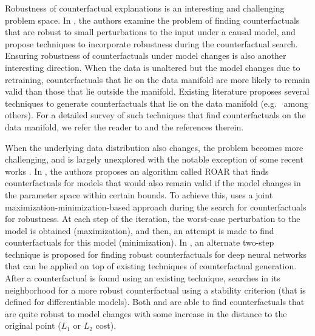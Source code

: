 \documentclass[sigconf]{acmart}
\newcommand{\sm}[1]{\textcolor{brown}{#1}}
\begin{document}
Robustness of counterfactual explanations is an interesting and challenging problem space. In \cite{dominguez2022adversarial}, the authors examine the problem of finding counterfactuals that are robust to small perturbations to the input under a causal model, and propose techniques to incorporate robustness during the counterfactual search. Ensuring robustness of counterfactuals under model changes is also another interesting direction. When the data is unaltered but the model changes due to retraining, counterfactuals that lie on the data manifold are more likely to remain valid than those that lie outside the manifold. Existing literature proposes several techniques to generate counterfactuals that lie on the data manifold (e.g.~\cite{konig2021causal,poyiadzi2020face,pawelczyk2020learning} among others). For a detailed survey of such techniques that find counterfactuals on the data manifold, we refer the reader to \cite{verma2020counterfactual} and the references therein.

When the underlying data distribution also changes, the problem becomes more challenging, and is largely unexplored with the notable exception of some recent works \cite{upadhyay2021towards,black_consistent_2021,dutta2022robust}. In  \cite{upadhyay2021towards}, the authors proposes an algorithm called ROAR that finds counterfactuals for models that would also remain valid if the model changes in the parameter space within certain bounds. To achieve this, \cite{upadhyay2021towards} uses a joint maximization-minimization-based approach during the search for counterfactuals for robustness. At each step of the iteration, the worst-case perturbation to the model is obtained (maximization), and then, an attempt is made to find counterfactuals for this model (minimization). In \cite{black_consistent_2021}, an alternate two-step technique is proposed for finding robust counterfactuals for deep neural networks that can be applied on top of existing techniques of counterfactual generation. After a counterfactual is found using an existing technique, \cite{black_consistent_2021} searches in its neighborhood for a more robust counterfactual using a stability criterion (that is defined for differentiable models). Both \cite{upadhyay2021towards} and \cite{black_consistent_2021} are able to find counterfactuals that are quite robust to model changes with some increase in the distance to the original point ($L_1$ or $L_2$ cost).
\end{document}
